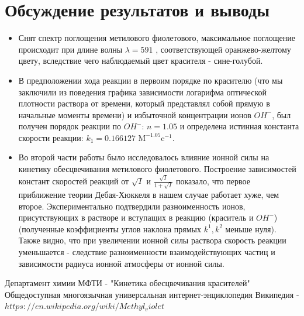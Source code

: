 \documentclass[a4paper,12pt]{article}
\begin{document}
\newpage

\section{Обсуждение результатов и выводы}
\begin{itemize}
    \item Снят спектр поглощения метилового фиолетового, максимальное поглощение происходит при длине волны $\lambda = 591$ , соответствующей оранжево-желтому цвету, вследствие чего наблюдаемый цвет красителя - сине-голубой. 
    \item В предположении хода реакции в первоим порядке по красителю (что мы заключили из поведения графика зависимости логарифма оптической плотности раствора от времени, который представлял собой прямую в начальные моменты времени) и избыточной концентрации ионов $OH^{-}$, был получен порядок реакции по  $OH^{-}$: $n = 1.05$ и определена истинная константа скорости реакции: $k_{1} =0.166127 \text{ M}^{-1.05}\text{c}^{-1}$. 
    \item Во второй части работы было исследовалось влияние ионной силы на кинетику обесцвечивания метилового фиолетового. Построение зависимостей констант скоростей реакций от $\sqrt{I}$ и $\frac{\sqrt{I}}{1+\sqrt{I}}$ показало, что первое приближение теории Дебая-Хюккеля в нашем случае работает хуже, чем второе. Экспериментально подтвердили разноименность ионов, присутствующих в растворе и вступащих в реакцию (краситель и $OH^{-}$) (полученные коэффициенты углов наклона прямых $k^{1}, k^{2}$ меньше нуля). Также видно, что при увеличении ионной силы раствора скорость реакции уменьшается - следствие разноименности взаимодействующих частиц и зависимости радиуса ионной атмосферы от ионной силы.
    
\end{itemize}






\newpage

\begin{thebibliography}{}
       Департамент химии МФТИ -  "Кинетика обесцвечивания красителей"
     Общедоступная многоязычная универсальная интернет-энциклопедия Википедия - 
$https://en.wikipedia.org/wiki/Methyl_violet$
\end{thebibliography}
\end{document}
